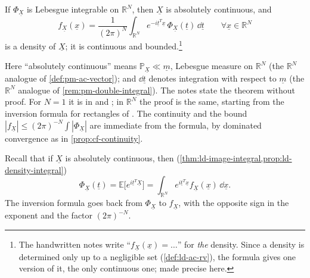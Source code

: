 \begin{theorem}\label{thm:cf-inversion}
If $\Phi_{\underline X}$ is Lebesgue integrable on $\mathbb R^N$, then $\underline X$ is
absolutely continuous, and
\[
  f_{\underline X}(\underline x)=\frac1{(2\pi)^N}\int_{\mathbb R^N}e^{-i\underline t^T\underline x}\,
  \Phi_{\underline X}(\underline t)\,\dd\underline t\qquad\forall\underline x\in\mathbb R^N
\]
is a density of $\underline X$; it is continuous and bounded.\footnote{The handwritten notes
write ``$f_{\underline X}(\underline x)=\dots$'' for \emph{the} density. Since a density is
determined only up to a negligible set (\cref{def:ld-ac-rv}), the formula gives one version of
it, the only continuous one; made precise here.}
\end{theorem}

Here ``absolutely continuous'' means $\mathbb P_{\underline X}\ll\underline m$, Lebesgue measure
on $\mathbb R^N$ (the $\mathbb R^N$ analogue of \cref{def:pm-ac-vector}); and $\dd\underline t$
denotes integration with respect to $\underline m$ (the $\mathbb R^N$ analogue of
\cref{rem:pm-double-integral}). The notes state the theorem without
proof. For $N=1$ it is in \citet[Section~26, ``Inversion and the Uniqueness
Theorem'']{billingsley} and \citet[Section~3.3.1]{durrett}; in $\mathbb R^N$ the proof is the
same, starting from the inversion formula for rectangles of \citet[Section~3.10]{durrett}. The
continuity and the bound $|f_{\underline X}|\le(2\pi)^{-N}\int|\Phi_{\underline X}|$ are
immediate from the formula, by dominated convergence as in \cref{prop:cf-continuity}.

Recall that if $\underline X$ is absolutely continuous, then
(\cref{thm:ld-image-integral,prop:ld-density-integral})
\[
  \Phi_{\underline X}(\underline t)=\mathbb E\big[e^{i\underline t^T\underline X}\big]
  =\int_{\mathbb R^N}e^{i\underline t^T\underline x}f_{\underline X}(\underline x)\,\dd\underline x .
\]
The inversion formula goes back from $\Phi_{\underline X}$ to $f_{\underline X}$, with the
opposite sign in the exponent and the factor $(2\pi)^{-N}$.

